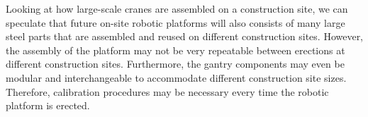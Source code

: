 \documentclass[11pt]{book}
\begin{document}
Looking at how large-scale cranes are assembled on a construction site, we can speculate that future on-site robotic platforms will also consists of many large steel parts that are assembled and reused on different construction sites. However, the assembly of the platform may not be very repeatable between erections at different construction sites. Furthermore, the gantry components may even be modular and interchangeable to accommodate different construction site sizes. Therefore, calibration procedures may be necessary every time the robotic platform is erected.
\end{document}
